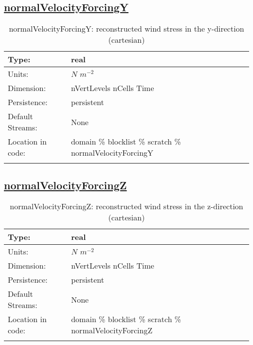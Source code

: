 \subsection[normalVelocityForcingY]{\hyperref[sec:var_tab_scratch]{normalVelocityForcingY}}
\label{subsec:var_sec_scratch_normalVelocityForcingY}
\begin{center}
\begin{longtable}{| p{2.0in} | p{4.0in} |}
        \hline 
        Type: & real \\
        \hline 
        Units: & $N$ $m^{-2}$ \\
        \hline 
        Dimension: & nVertLevels nCells Time \\
        \hline 
        Persistence: & persistent \\
        \hline 
		 Default Streams: & None \\
        \hline 
		 Location in code: & domain \% blocklist \% scratch \% normalVelocityForcingY \\
		 \hline 
    \caption{normalVelocityForcingY: reconstructed wind stress in the y-direction (cartesian)}
\end{longtable}
\end{center}
\subsection[normalVelocityForcingZ]{\hyperref[sec:var_tab_scratch]{normalVelocityForcingZ}}
\label{subsec:var_sec_scratch_normalVelocityForcingZ}
\begin{center}
\begin{longtable}{| p{2.0in} | p{4.0in} |}
        \hline 
        Type: & real \\
        \hline 
        Units: & $N$ $m^{-2}$ \\
        \hline 
        Dimension: & nVertLevels nCells Time \\
        \hline 
        Persistence: & persistent \\
        \hline 
		 Default Streams: & None \\
        \hline 
		 Location in code: & domain \% blocklist \% scratch \% normalVelocityForcingZ \\
		 \hline 
    \caption{normalVelocityForcingZ: reconstructed wind stress in the z-direction (cartesian)}
\end{longtable}
\end{center}
